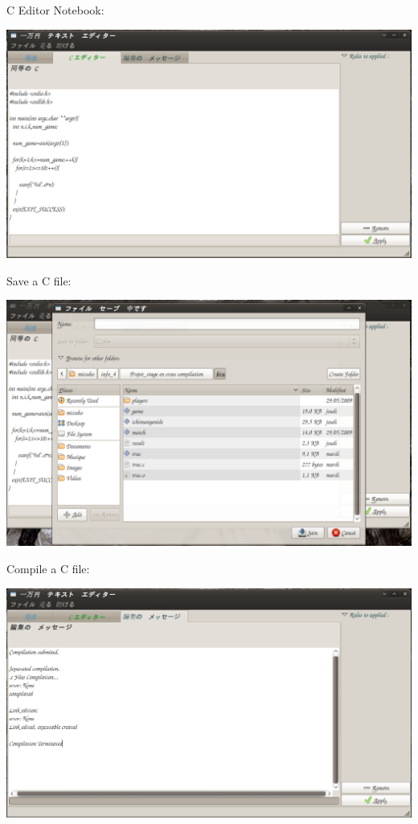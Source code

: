 \documentclass[11pt]{sample}
\begin{document}
\newpage
C Editor Notebook:
\begin{center}\includegraphics[height=20\baselineskip]{img/Editor.png}\end{center}
 Save a C file:
\begin{center}\includegraphics[height=20\baselineskip]{img/Saving-file.png}\end{center}\newpage
 Compile a C file:
\begin{center}\includegraphics[height=20\baselineskip]{img/Compiler.png}\end{center}
\end{document}
